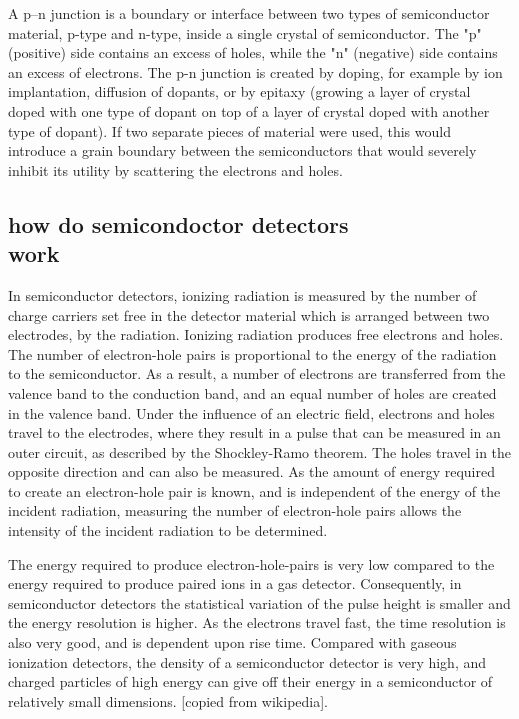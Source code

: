 \documentclass[]{article}
\begin{document}
A p–n junction is a boundary or interface between two types of semiconductor material, p-type and n-type, inside a single crystal of semiconductor. The "p" (positive) side contains an excess of holes, while the "n" (negative) side contains an excess of electrons. The p-n junction is created by doping, for example by ion implantation, diffusion of dopants, or by epitaxy (growing a layer of crystal doped with one type of dopant on top of a layer of crystal doped with another type of dopant). If two separate pieces of material were used, this would introduce a grain boundary between the semiconductors that would severely inhibit its utility by scattering the electrons and holes.

\subsection{how do semicondoctor detectors \\ work}
In semiconductor detectors, ionizing radiation is measured by the number of charge carriers set free in the detector material which is arranged between two electrodes, by the radiation. Ionizing radiation produces free electrons and holes. The number of electron-hole pairs is proportional to the energy of the radiation to the semiconductor. As a result, a number of electrons are transferred from the valence band to the conduction band, and an equal number of holes are created in the valence band. Under the influence of an electric field, electrons and holes travel to the electrodes, where they result in a pulse that can be measured in an outer circuit, as described by the Shockley-Ramo theorem. The holes travel in the opposite direction and can also be measured. As the amount of energy required to create an electron-hole pair is known, and is independent of the energy of the incident radiation, measuring the number of electron-hole pairs allows the intensity of the incident radiation to be determined.

The energy required to produce electron-hole-pairs is very low compared to the energy required to produce paired ions in a gas detector. Consequently, in semiconductor detectors the statistical variation of the pulse height is smaller and the energy resolution is higher. As the electrons travel fast, the time resolution is also very good, and is dependent upon rise time. Compared with gaseous ionization detectors, the density of a semiconductor detector is very high, and charged particles of high energy can give off their energy in a semiconductor of relatively small dimensions. [copied from wikipedia]. 
\end{document}
